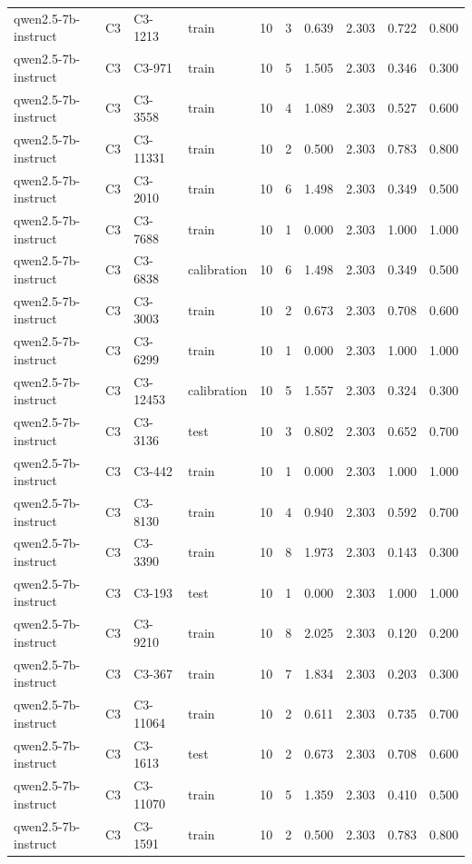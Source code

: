 \begin{table}
\begin{tabular}{llllrrrrrr}
qwen2.5-7b-instruct & C3 & C3-1213 & train & 10 & 3 & 0.639 & 2.303 & 0.722 & 0.800 \\
qwen2.5-7b-instruct & C3 & C3-971 & train & 10 & 5 & 1.505 & 2.303 & 0.346 & 0.300 \\
qwen2.5-7b-instruct & C3 & C3-3558 & train & 10 & 4 & 1.089 & 2.303 & 0.527 & 0.600 \\
qwen2.5-7b-instruct & C3 & C3-11331 & train & 10 & 2 & 0.500 & 2.303 & 0.783 & 0.800 \\
qwen2.5-7b-instruct & C3 & C3-2010 & train & 10 & 6 & 1.498 & 2.303 & 0.349 & 0.500 \\
qwen2.5-7b-instruct & C3 & C3-7688 & train & 10 & 1 & 0.000 & 2.303 & 1.000 & 1.000 \\
qwen2.5-7b-instruct & C3 & C3-6838 & calibration & 10 & 6 & 1.498 & 2.303 & 0.349 & 0.500 \\
qwen2.5-7b-instruct & C3 & C3-3003 & train & 10 & 2 & 0.673 & 2.303 & 0.708 & 0.600 \\
qwen2.5-7b-instruct & C3 & C3-6299 & train & 10 & 1 & 0.000 & 2.303 & 1.000 & 1.000 \\
qwen2.5-7b-instruct & C3 & C3-12453 & calibration & 10 & 5 & 1.557 & 2.303 & 0.324 & 0.300 \\
qwen2.5-7b-instruct & C3 & C3-3136 & test & 10 & 3 & 0.802 & 2.303 & 0.652 & 0.700 \\
qwen2.5-7b-instruct & C3 & C3-442 & train & 10 & 1 & 0.000 & 2.303 & 1.000 & 1.000 \\
qwen2.5-7b-instruct & C3 & C3-8130 & train & 10 & 4 & 0.940 & 2.303 & 0.592 & 0.700 \\
qwen2.5-7b-instruct & C3 & C3-3390 & train & 10 & 8 & 1.973 & 2.303 & 0.143 & 0.300 \\
qwen2.5-7b-instruct & C3 & C3-193 & test & 10 & 1 & 0.000 & 2.303 & 1.000 & 1.000 \\
qwen2.5-7b-instruct & C3 & C3-9210 & train & 10 & 8 & 2.025 & 2.303 & 0.120 & 0.200 \\
qwen2.5-7b-instruct & C3 & C3-367 & train & 10 & 7 & 1.834 & 2.303 & 0.203 & 0.300 \\
qwen2.5-7b-instruct & C3 & C3-11064 & train & 10 & 2 & 0.611 & 2.303 & 0.735 & 0.700 \\
qwen2.5-7b-instruct & C3 & C3-1613 & test & 10 & 2 & 0.673 & 2.303 & 0.708 & 0.600 \\
qwen2.5-7b-instruct & C3 & C3-11070 & train & 10 & 5 & 1.359 & 2.303 & 0.410 & 0.500 \\
qwen2.5-7b-instruct & C3 & C3-1591 & train & 10 & 2 & 0.500 & 2.303 & 0.783 & 0.800 \\

\end{tabular}
\end{table}

